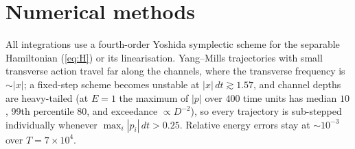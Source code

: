 \documentclass[11pt,a4paper]{article}
\begin{document}
\section{Numerical methods}
\label{sec:methods}

All integrations use a fourth-order Yoshida symplectic scheme \cite{Yoshida} for the separable
Hamiltonian (\ref{eq:H}) or its linearisation. Yang--Mills trajectories with small transverse
action travel far along the channels, where the transverse frequency is $\sim|x|$; a fixed-step
scheme becomes unstable at $|x|\,dt\gtrsim1.57$, and channel depths are heavy-tailed (at $E=1$
the maximum of $|p|$ over $400$ time units has median $10$, 99th percentile $80$, and exceedance
$\propto D^{-2}$), so every trajectory is sub-stepped individually whenever
$\max_i|p_i|\,dt>0.25$. Relative energy errors stay at $\sim10^{-3}$ over $T=7\times10^4$.
\end{document}

